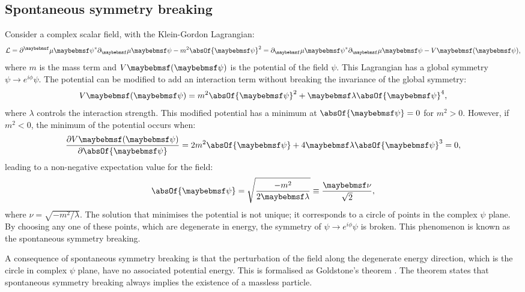 
\subsection{Spontaneous symmetry breaking}

Consider a complex scalar field, with the Klein-Gordon Lagrangian:
\begin{equation}
\Lagr = \partial^\mu{\psi}^*\partial_\mu\psi - m^2 \absOf{\psi}^2 =  \partial_\mu{\psi}^*\partial_\mu\psi - V\parenths{\psi} ,
\label{eq:theoryKGLagrangian}
\end{equation}
where $m$ is the mass term and $V\parenths{\psi} $ is the potential of the field $\psi$. This Lagrangian has a global symmetry $\psi \to e^{i\phi}\psi$. The potential can be modified to add an interaction term without breaking the  invariance of the global symmetry:
\begin{equation}
V\parenths{\psi} =  m^2 \absOf{\psi}^2 + \lambda\absOf{\psi}^4,
\label{eq:theoryHiggsPotential}
\end{equation}
where $\lambda$ controls the interaction strength. This modified potential has a minimum at $ \absOf{\psi}=0$ for $m^2>0$. However, if $m^2<0$, the minimum of the potential occurs when:
\begin{equation}
\frac{\partial{V}\parenths{\psi}}{\partial{\absOf{\psi}}} =  2 m^2 \absOf{\psi} + 4\lambda\absOf{\psi}^3 = 0,
\end{equation}
leading to a non-negative expectation value for the field:
\begin{equation}
\absOf{\psi} = \sqrt{\frac{-m^2}{2\lambda}}\equiv \frac{\nu}{\sqrt{2}},
\end{equation}
where $\nu = \sqrt{-m^2/\lambda}$. The solution that minimises the potential is not unique; it corresponds to a circle of points in the complex $\psi$ plane. By choosing any one of these points, which are degenerate in energy, the symmetry of   $\psi \to e^{i\phi}\psi$ is broken. This phenomenon is known as the spontaneous symmetry breaking.

A consequence of  spontaneous symmetry breaking is that the perturbation of the field along the degenerate energy direction, which is the circle in complex $\psi$ plane, have no associated potential energy. This is formalised as Goldstone's theorem \cite{Nambu:1960tm,Goldstone:1961eq}. The theorem states that spontaneous symmetry breaking always implies the existence of a massless particle.

